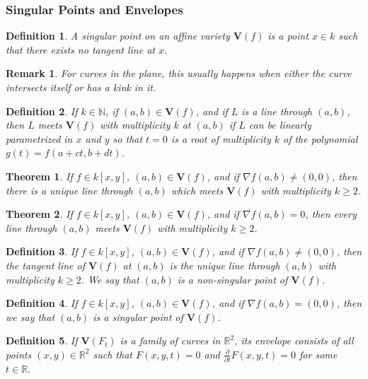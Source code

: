 \documentclass[oneside]{book}
\theoremstyle{mystyle}
\newtheorem{theorem}{Theorem}[section]
\newtheorem{definition}{Definition}[section]
\newtheorem{remark}{Remark}[section]
\begin{document}
\subsubsection{Singular Points and Envelopes}
\begin{definition}
A singular point on an affine variety $\mathbf{V}(f)$ is a point $x\in k$ such that there exists no tangent line at $x$.
\end{definition}
\begin{remark}
For curves in the plane, this usually happens when either the curve intersects itself or has a kink in it.
\end{remark}
\begin{definition}
If $k\in \mathbb{N}$, if $(a,b)\in \mathbf{V}(f)$, and if $L$ is a line through $(a,b)$, then $L$ meets $\mathbf{V}(f)$ with multiplicity $k$ at $(a,b)$ if $L$ can be linearly parametrized in $x$ and $y$ so that $t=0$ is a root of multiplicity $k$ of the polynomial $g(t) = f(a+ct,b+dt)$.
\end{definition}
\begin{theorem}
If $f\in k[x,y]$, $(a,b) \in \mathbf{V}(f)$, and if $\nabla f(a,b) \ne (0,0)$, then there is a unique line through $(a,b)$ which meets $\mathbf{V}(f)$ with multiplicity $k\geq 2$.
\end{theorem}
\begin{theorem}
If $f\in k[x,y]$, $(a,b) \in \mathbf{V}(f)$, and if $\nabla f(a,b) = 0$, then every line through $(a,b)$ meets $\mathbf{V}(f)$ with multiplicity $k \geq 2$.
\end{theorem}
\begin{definition}
If $f\in k[x,y]$, $(a,b) \in \mathbf{V}(f)$, and if $\nabla f(a,b) \ne (0,0)$, then the tangent line of $\mathbf{V}(f)$ at $(a,b)$ is the unique line through $(a,b)$ with multiplicity $k\geq 2$. We say that $(a,b)$ is a non-singular point of $\mathbf{V}(f)$.
\end{definition}
\begin{definition}
If $f\in k[x,y]$, $(a,b) \in \mathbf{V}(f)$, and if $\nabla f(a,b) = (0,0)$, then we say that $(a,b)$ is a singular point of $\mathbf{V}(f)$.
\end{definition}
\begin{definition}
If $\mathbf{V}(F_t)$ is a family of curves in $\mathbb{R}^2$, its envelope consists of all points $(x,y) \in \mathbb{R}^2$ such that $F(x,y,t) = 0$ and $\frac{\partial}{\partial t}F(x,y,t) = 0$ for some $t\in \mathbb{R}$.
\end{definition}
\end{document}
